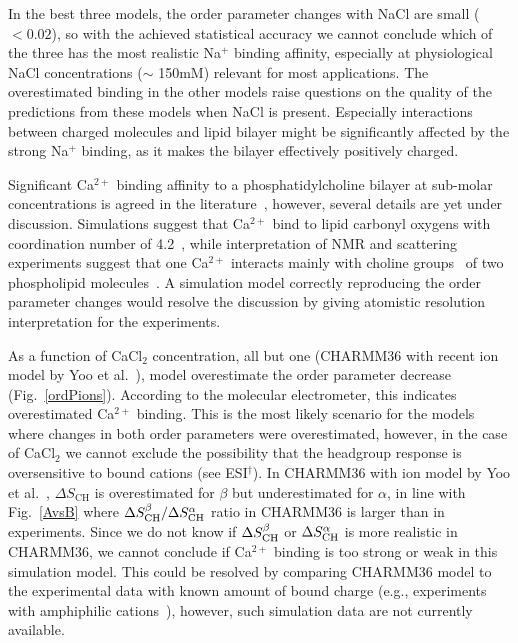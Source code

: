 \documentclass[twoside,twocolumn,9pt]{article}
\begin{document}
In the best three models, the order parameter changes with NaCl are small ($<0.02$), so
with the achieved statistical accuracy we cannot conclude 
which of the three has the most realistic Na$^+$ binding affinity,
especially at physiological NaCl concentrations ($\sim$ 150mM) 
relevant for most applications. 
The overestimated binding in the other models raise questions on the quality of the predictions from these models when NaCl is present.
Especially interactions between charged molecules and lipid bilayer might be significantly
affected by the strong Na$^+$ binding, as it makes the bilayer effectively positively charged.

Significant Ca$^{2+}$ binding affinity to a phosphatidylcholine bilayer at sub-molar concentrations  
is agreed in the literature~\cite{akutsu81,altenbach84,cevc90,tocanne90}, however, several
details are yet under discussion. Simulations suggest that Ca$^{2+}$ bind to lipid carbonyl
oxygens with coordination number of 4.2~\cite{bockmann04}, while interpretation of NMR and 
scattering experiments suggest that one Ca$^{2+}$ interacts mainly with choline 
groups~\cite{hauser76,hauser78,herbette84} of two phospholipid molecules~\cite{altenbach84}. 
A simulation model correctly reproducing the order parameter changes would resolve the discussion
by giving atomistic resolution interpretation for the experiments.

As a function of CaCl$_2$ concentration, all but one (CHARMM36 with recent ion model by Yoo et al.~\cite{yoo16}),
model overestimate the order parameter decrease (Fig.~\ref{ordPions}). 
According to the molecular electrometer, this indicates overestimated Ca$^{2+}$ binding. 
This is the most likely scenario for the models where changes in both order parameters were overestimated,
however, in the case of CaCl$_2$ we cannot exclude the possibility that the headgroup response is oversensitive to
bound cations (see ESI$^\dag$).
In CHARMM36 with ion model by Yoo et al.~\cite{yoo16},
$\Delta S_\mathrm{CH}$ is overestimated for $\beta$  but underestimated for  $\alpha$,
in line with Fig.~\ref{AvsB} where $\Delta S_{\rm{CH}}^{\beta}/\Delta S_{\rm{CH}}^{\alpha}$ ratio
in CHARMM36 is larger  than in experiments. Since we do not know if $\Delta S_{\rm{CH}}^{\beta}$ or $\Delta S_{\rm{CH}}^{\alpha}$
is more realistic in CHARMM36, we cannot conclude if Ca$^{2+}$ binding is too strong or weak in this simulation model.
This could be resolved by comparing CHARMM36 model to the experimental data with known amount of bound charge 
(e.g., experiments with amphiphilic cations~\cite{scherer89,franzin98}), however, such simulation data are not
currently available.
\end{document}
